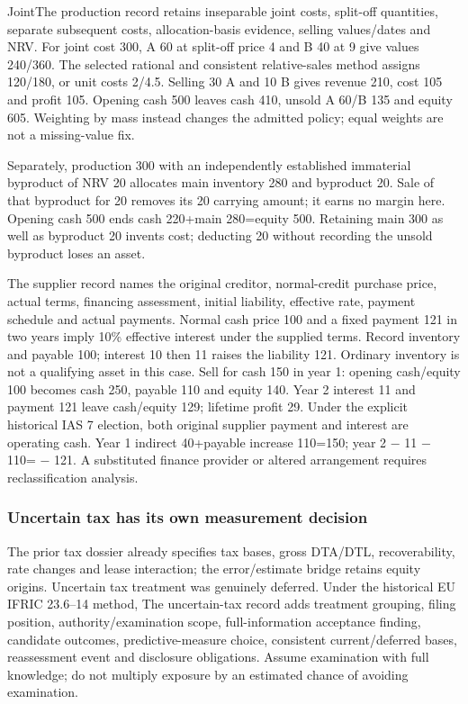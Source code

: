 JointThe production record retains inseparable joint costs, split-off quantities, separate subsequent costs, allocation-basis evidence, selling values/dates and NRV. For joint cost 300, A 60 at split-off price 4 and B 40 at 9 give values 240/360. The selected rational and consistent relative-sales method assigns 120/180, or unit costs 2/4.5. Selling 30 A and 10 B gives revenue 210, cost 105 and profit 105. Opening cash 500 leaves cash 410, unsold A 60/B 135 and equity 605. Weighting by mass instead changes the admitted policy; equal weights are not a missing-value fix.

Separately, production 300 with an independently established immaterial byproduct of NRV 20 allocates main inventory 280 and byproduct 20. Sale of that byproduct for 20 removes its 20 carrying amount; it earns no margin here. Opening cash 500 ends cash 220+main 280=equity 500. Retaining main 300 as well as byproduct 20 invents cost; deducting 20 without recording the unsold byproduct loses an asset.

The supplier record names the original creditor, normal-credit purchase price, actual terms, financing assessment, initial liability, effective rate, payment schedule and actual payments. Normal cash price 100 and a fixed payment 121 in two years imply 10\% effective interest under the supplied terms. Record inventory and payable 100; interest 10 then 11 raises the liability 121. Ordinary inventory is not a qualifying asset in this case. Sell for cash 150 in year 1: opening cash/equity 100 becomes cash 250, payable 110 and equity 140. Year 2 interest 11 and payment 121 leave cash/equity 129; lifetime profit 29. Under the explicit historical IAS 7 election, both original supplier payment and interest are operating cash. Year 1 indirect 40+payable increase 110=150; year 2 − 11 − 110= − 121. A substituted finance provider or altered arrangement requires reclassification analysis.

\hypertarget{uncertain-tax-has-its-own-measurement-decision}{%
\subsubsection{Uncertain tax has its own measurement decision}\label{uncertain-tax-has-its-own-measurement-decision}}

The prior tax dossier already specifies tax bases, gross DTA/DTL, recoverability, rate changes and lease interaction; the error/estimate bridge retains equity origins. Uncertain tax treatment was genuinely deferred. Under the historical EU IFRIC 23.6--14 method, The uncertain-tax record adds treatment grouping, filing position, authority/examination scope, full-information acceptance finding, candidate outcomes, predictive-measure choice, consistent current/deferred bases, reassessment event and disclosure obligations. Assume examination with full knowledge; do not multiply exposure by an estimated chance of avoiding examination.

